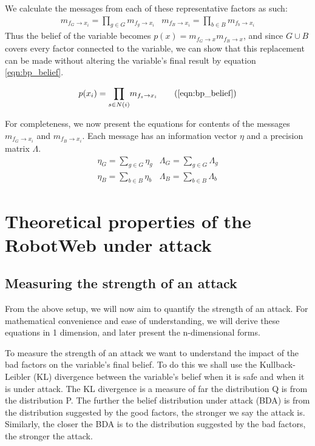 We calculate the messages from each of these representative factors as such:
\begin{eqnarray}
	m_{f_G \rightarrow x_i} = \underset{g \in G}{\prod} m_{f_g \rightarrow x_i}&
	m_{f_B \rightarrow x_i} = \underset{b \in B}{\prod} m_{f_b \rightarrow x_i}
\end{eqnarray}
Thus the belief of the variable becomes $p(x) = m_{f_G \rightarrow x} m_{f_B \rightarrow x}$, and since $G \cup B$ covers every factor connected to the variable, we can show that this replacement can be made without altering the variable's final result by equation \ref{eqn:bp_belief}.

\begin{equation}
	p(x_i) = \underset{s \in N(i)}{\prod} m_{f_s \rightarrow x_i}
	\tag{\ref{eqn:bp_belief}}
\end{equation}

For completeness, we now present the equations for contents of the messages $m_{f_G \rightarrow x_i}$ and $m_{f_B \rightarrow x_i}$. 
Each message has an information vector $\eta$ and a precision matrix $\Lambda$.
\begin{eqnarray}
	\eta_G = \underset{g \in G}{\sum} \eta_g&
	\Lambda_G = \underset{g \in G}{\sum} \Lambda_g \label{eqn:good_pull}\\
	\eta_B = \underset{b \in B}{\sum} \eta_b&
	\Lambda_B = \underset{b \in B}{\sum} \Lambda_b \label{eqn:bad_pull}
\end{eqnarray}

\section{Theoretical properties of the RobotWeb under attack}
\subsection{Measuring the strength of an attack}
From the above setup, we will now aim to quantify the strength of an attack. For mathematical convenience and ease of understanding, we will derive these equations in 1 dimension, and later present the n-dimensional forms.

To measure the strength of an attack we want to understand the impact of the bad factors on the variable's final belief. To do this we shall use the Kullback-Leibler (KL) divergence \citationneeded between the variable's belief when it is safe and when it is under attack.
The KL divergence is a measure of far the distribution Q is from the distribution P. The further the belief distribution under attack (BDA) is from the distribution suggested by the good factors, the stronger we say the attack is. Similarly, the closer the BDA is to the distribution suggested by the bad factors, the stronger the attack.

